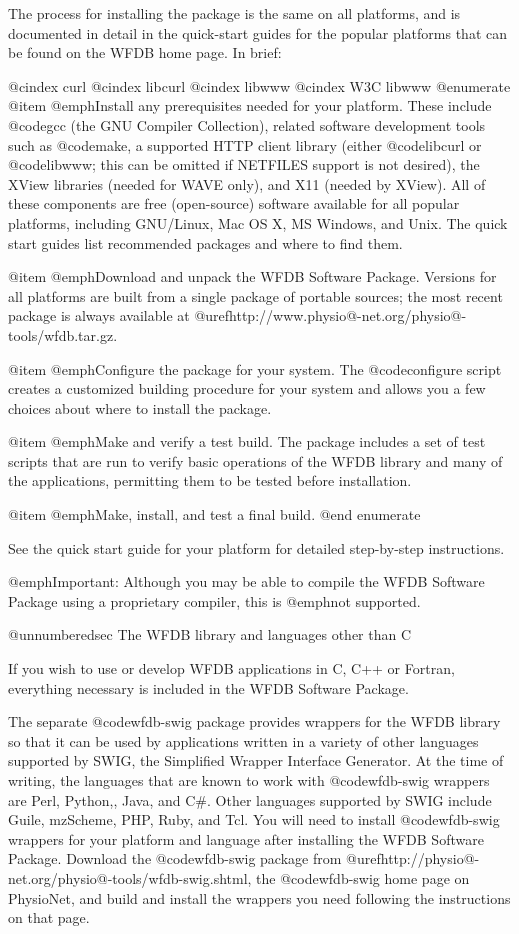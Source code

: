 {{{{{{{{{The process for installing the package is the same on all platforms, and
is documented in detail in the quick-start guides for the popular platforms
that can be found on the WFDB home page.  In brief:

@cindex curl
@cindex libcurl
@cindex libwww
@cindex W3C libwww
@enumerate
@item
@emph{Install any prerequisites needed for your platform.}  These include
@code{gcc} (the GNU Compiler Collection), related software development tools
such as @code{make}, a supported HTTP client library (either @code{libcurl} or
@code{libwww}; this can be omitted if NETFILES support is not desired), the
XView libraries (needed for WAVE only), and X11 (needed by XView). All of these
components are free (open-source) software available for all popular platforms,
including GNU/Linux, Mac OS X, MS Windows, and Unix.  The quick start guides
list recommended packages and where to find them.

@item
@emph{Download and unpack the WFDB Software Package.}  Versions for all
platforms are built from a single package of portable sources;  the most
recent package is always available at
@uref{http://www.physio@-net.org/physio@-tools/wfdb.tar.gz}.

@item
@emph{Configure the package for your system.}  The @code{configure} script
creates a customized building procedure for your system and allows you
a few choices about where to install the package.

@item
@emph{Make and verify a test build.}  The package includes a set of test
scripts that are run to verify basic operations of the WFDB library and
many of the applications, permitting them to be tested before installation.

@item
@emph{Make, install, and test a final build.}
@end enumerate

See the quick start guide for your platform for detailed step-by-step
instructions.

@emph{Important:} Although you may be able to compile the WFDB Software Package
using a proprietary compiler, this is @emph{not supported}.

@unnumberedsec The WFDB library and languages other than C

If you wish to use or develop WFDB applications in C, C++ or Fortran,
everything necessary is included in the WFDB Software Package.

The separate @code{wfdb-swig} package provides wrappers for the WFDB library
so that it can be used by applications written in a variety of other languages
supported by SWIG, the Simplified Wrapper Interface Generator.  At the time
of writing, the languages that are known to work with @code{wfdb-swig} wrappers
are Perl, Python,, Java, and C#.  Other languages supported by SWIG include
Guile, mzScheme, PHP, Ruby, and Tcl. You will need to install @code{wfdb-swig}
wrappers for your platform and language after installing the WFDB Software
Package.  Download the @code{wfdb-swig} package from
@uref{http://physio@-net.org/physio@-tools/wfdb-swig.shtml}, the
@code{wfdb-swig} home page on PhysioNet, and build and install the wrappers
you need following the instructions on that page.

}}}}}}}}}
